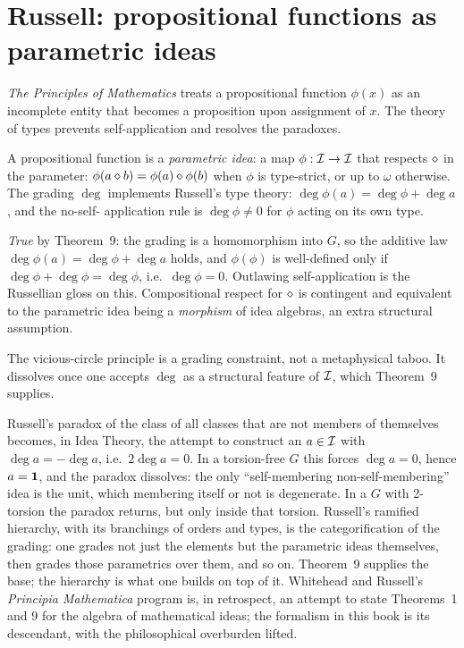 \section{Russell: propositional functions as parametric
ideas}\label{sec:russell}

 \emph{The Principles of Mathematics}
\cite{Russell1903} treats a propositional function $\phi(x)$ as an
incomplete entity that becomes a proposition upon assignment of $x$.
The theory of types prevents self-application and resolves the
paradoxes.

\formalclaim A propositional function is a \emph{parametric idea}: a
map $\phi:\mathcal{I} \to \mathcal{I}$ that respects $\mathbin{\diamond}$ in the parameter:
$\phi(a\mathbin{\diamond} b) = \phi(a)\mathbin{\diamond}\phi(b)$ when $\phi$ is type-strict,
or up to $\omega$ otherwise. The grading $\deg$ implements Russell's
type theory: $\deg\phi(a) = \deg\phi + \deg a$, and the no-self-
application rule is $\deg\phi \neq 0$ for $\phi$ acting on its own
type.

\formalstatus \emph{True} by Theorem~9: the grading is a homomorphism
into $G$, so the additive law $\deg\phi(a) = \deg\phi + \deg a$ holds,
and $\phi(\phi)$ is well-defined only if $\deg\phi + \deg\phi = \deg\phi$,
i.e.\ $\deg\phi=0$. Outlawing self-application is the Russellian gloss
on this. Compositional respect for $\mathbin{\diamond}$ is contingent and
equivalent to the parametric idea being a \emph{morphism} of idea
algebras, an extra structural assumption.

\litcomment The vicious-circle principle is a grading constraint, not a
metaphysical taboo. It dissolves once one accepts $\deg$ as a structural
feature of $\mathcal{I}$, which Theorem~9 supplies.

Russell's paradox of the class of all classes that are not members of
themselves becomes, in Idea Theory, the attempt to construct an
$a\in\mathcal{I}$ with $\deg a = -\deg a$, i.e.\ $2\deg a = 0$. In a
torsion-free $G$ this forces $\deg a = 0$, hence $a = \mathbf{1}$, and the
paradox dissolves: the only ``self-membering non-self-membering'' idea
is the unit, which membering itself or not is degenerate. In a $G$
with 2-torsion the paradox returns, but only inside that
torsion. Russell's ramified hierarchy, with its branchings of orders
and types, is the categorification of the grading: one grades not just
the elements but the parametric ideas themselves, then grades those
parametrics over them, and so on. Theorem~9 supplies the base; the
hierarchy is what one builds on top of it. Whitehead and Russell's
\emph{Principia Mathematica} program is, in retrospect, an attempt to
state Theorems~1 and 9 for the algebra of mathematical ideas; the
formalism in this book is its descendant, with the philosophical
overburden lifted.

